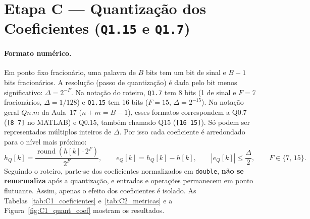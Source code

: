 \documentclass[11pt,a4paper]{article}
\begin{document}
\section{Etapa C — Quantização dos Coeficientes (\texttt{Q1.15} e \texttt{Q1.7})}

\paragraph{Formato numérico.} Em ponto fixo fracionário, uma palavra de $B$ bits tem um bit de sinal e $B - 1$ bits fracionários. A resolução (passo de quantização) é dada pelo bit menos significativo: $\Delta = 2^{-F}$. Na notação do roteiro, \texttt{Q1.7} tem 8 bits (1 de sinal e $F = 7$ fracionários, $\Delta = 1/128$) e \texttt{Q1.15} tem 16 bits ($F = 15$, $\Delta = 2^{-15}$). Na notação geral $Q n.m$ da Aula~17 ($n + m = B - 1$), esses formatos correspondem a Q0.7 (\texttt{[8 7]} no MATLAB) e Q0.15, também chamado Q15 (\texttt{[16 15]}). Só podem ser representados múltiplos inteiros de $\Delta$. Por isso cada coeficiente é arredondado para o nível mais próximo:
\begin{equation}
    h_Q[k] = \frac{\operatorname{round}\!\left(h[k]\cdot 2^F\right)}{2^F}, \qquad e_Q[k] = h_Q[k] - h[k], \qquad |e_Q[k]| \le \frac{\Delta}{2}, \qquad F \in \{7,\, 15\}.
\end{equation}
Seguindo o roteiro, parte-se dos coeficientes normalizados em \texttt{double}, \textbf{não se renormaliza} após a quantização, e entradas e operações permanecem em ponto flutuante. Assim, apenas o efeito dos coeficientes é isolado. As Tabelas~\ref{tab:C1_coeficientes} e~\ref{tab:C2_metricas} e a Figura~\ref{fig:C1_quant_coef} mostram os resultados.
\end{document}
